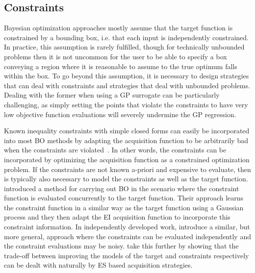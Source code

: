\subsection{Constraints}
\label{sec:opt:BO:exten:constraints}

Bayesian optimization approaches mostly assume that the target function
is constrained by a bounding box, i.e. that each input is independently constrained.
In practice, this assumption is rarely fulfilled, though for technically unbounded 
problems then it is not uncommon
for the user to be able to specify a box conveying a region where it is reasonable to
assume to the true optimum falls within the box.  To go beyond this assumption, it is
necessary to design strategies that can deal with constraints and strategies that deal
with unbounded problems.  Dealing with the former when using a GP surrogate can
be particularly challenging, as simply setting the points that violate the constraints
to have very low objective function evaluations will severely undermine the GP
regression.

Known inequality constraints with simple closed forms can easily be incorporated
into most BO methods by adapting the acquisition function to be arbitrarily bad when the
constraints are violated~\citep{gramacy4027optimization}.  In other words, the constraints
can be incorporated by optimizing the acquisition function as a constrained optimization
problem.  If the constraints are not known a-priori  and expensive to evaluate, then
is typically also necessary to model the constraints as well as the target function.
\cite{gardner2014bayesian} introduced a method for carrying out BO in the scenario where
the constraint function is evaluated concurrently to the target function.  Their approach learns
the constraint function in a similar way as the target function using
a Gaussian process and they then adapt the EI acquisition function to incorporate this constraint
information.  In independently developed work, \cite{gelbart2014bayesian} introduce a similar, but more
general, approach where the constraints can be evaluated independently and the constraint
evaluations may be noisy.  \cite{hernandez2016general} take this further by showing that
the trade-off between improving the models of the target and
constraints respectively can be dealt with naturally by ES based acquisition strategies.

